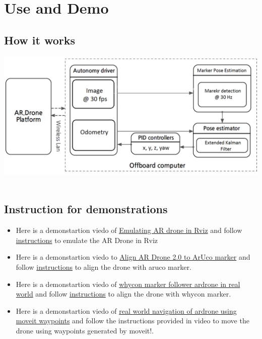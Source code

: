\documentclass[a4paper,12pt,oneside]{book}
\begin{document}
\pagebreak

\chapter[Use and Demo]{Use and Demo}
\section{How it works}
\begin{center}
\includegraphics[scale=0.55]{pid_ardrone}\\\
\end{center}

 
\section{Instruction for demonstrations}
\begin{itemize}
\item Here is a demonstartion viedo of 
\href{https://www.youtube.com/watch?v=W7t_BQyy5vk&index=13&list=PLz8Xi5I9bhzKuFfcQxWvMm9sVCR5Wng90}{Emulating AR drone in Rviz} and follow \href{https://github.com/eYSIP-2017/eYSIP-2017_Navigation-in-Indoor-Environments-using-drone/wiki/Emulating-AR-drone-2-in-Rviz}{instructions} to emulate the AR Drone in Rviz

\item Here is a demonstartion viedo to 
\href{https://www.youtube.com/watch?v=Q2GwBIR4_pk&list=PLz8Xi5I9bhzKuFfcQxWvMm9sVCR5Wng90&index=14}{Align AR Drone 2.0 to ArUco marker} and follow \href{https://github.com/eYSIP-2017/eYSIP-2017_Navigation-in-Indoor-Environments-using-drone/wiki/Aligning-with-aruco-marker}{instructions} to align the drone with aruco marker.


\item Here is a demonstartion viedo of 
\href{https://www.youtube.com/watch?v=UVOoqWIJwnI&list=PLz8Xi5I9bhzKuFfcQxWvMm9sVCR5Wng90&index=15}{whycon marker follower ardrone in real world} and follow \href{https://github.com/eYSIP-2017/eYSIP-2017_Navigation-in-Indoor-Environments-using-drone/wiki/Aligning-with-whycon-marker}{instructions} to align the drone with whycon marker.

\item Here is a demonstartion viedo of 
\href{https://www.youtube.com/watch?v=8vy9cVHUimo&index=16&list=PLz8Xi5I9bhzKuFfcQxWvMm9sVCR5Wng90}{real world navigation of ardrone using moveit waypoints} and follow the instructions provided in video to move the drone using waypoints generated by moveit!.

\end{itemize}
\end{document}
